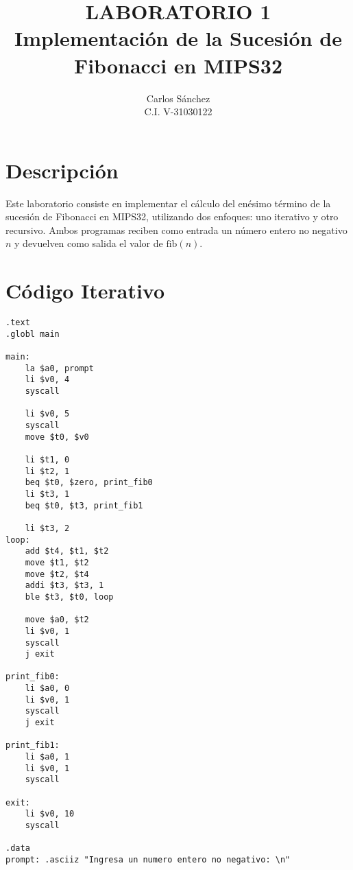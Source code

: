 \documentclass[12pt]{article}
\title{\textbf{LABORATORIO 1}\\Implementación de la Sucesión de Fibonacci en MIPS32}
\author{Carlos Sánchez \\ C.I. V-31030122}
\date{}
\begin{document}
\maketitle

\section*{Descripción}
Este laboratorio consiste en implementar el cálculo del enésimo término de la sucesión de Fibonacci en MIPS32, utilizando dos enfoques: uno iterativo y otro recursivo. Ambos programas reciben como entrada un número entero no negativo \( n \) y devuelven como salida el valor de \( \text{fib}(n) \).

\section*{Código Iterativo}
\begin{lstlisting}
.text
.globl main

main:
    la $a0, prompt
    li $v0, 4
    syscall

    li $v0, 5
    syscall
    move $t0, $v0

    li $t1, 0
    li $t2, 1
    beq $t0, $zero, print_fib0
    li $t3, 1
    beq $t0, $t3, print_fib1

    li $t3, 2
loop:
    add $t4, $t1, $t2
    move $t1, $t2
    move $t2, $t4
    addi $t3, $t3, 1
    ble $t3, $t0, loop

    move $a0, $t2
    li $v0, 1
    syscall
    j exit

print_fib0:
    li $a0, 0
    li $v0, 1
    syscall
    j exit

print_fib1:
    li $a0, 1
    li $v0, 1
    syscall

exit:
    li $v0, 10
    syscall

.data
prompt: .asciiz "Ingresa un numero entero no negativo: \n"
\end{lstlisting}
\end{document}
